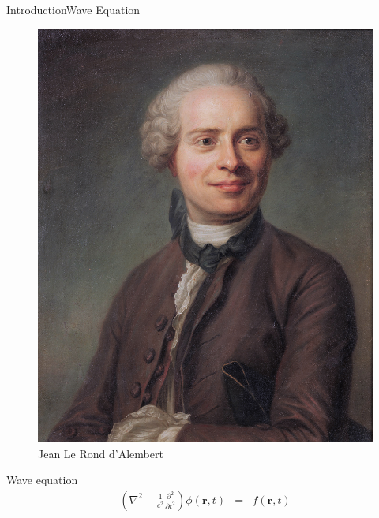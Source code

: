 \documentclass[9pt, xcolor={usenames, dvipsnames}]{beamer}
\begin{document}
				\begin{frame}{Introduction}{Wave Equation}
					\centering
					\begin{minipage}[c]{0.3\textwidth}
						\begin{figure}
							\includegraphics[width=\textwidth]{images/profile/Jean_Le_Rond_d'Alembert,_by_French_school.jpg}
							\caption{Jean Le Rond d'Alembert}
						\end{figure}
					\end{minipage}
					\hfill
					\begin{minipage}[c]{0.6\textwidth}
						\begin{alertblock}{Wave equation}
							\begin{eqnarray}
								\left(\nabla^2 - \frac{1}{c^2} \frac{\partial^2}{\partial t^2} \right) \phi(\mathbf{r}, t) & = & f(\mathbf{r}, t) \label{equation:alembert}
							\end{eqnarray}
						\end{alertblock}
					\end{minipage}
				\end{frame}
\end{document}
